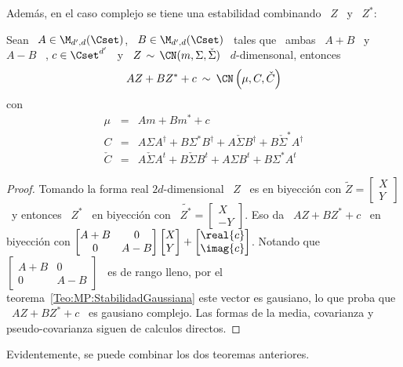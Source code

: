 Adem\'as, en el  caso complejo se tiene  una estabilidad combinando \ $Z$  \ y \
$Z^*$:
%
\begin{teorema}%
\label{Teo:MP:StabilidadGaussianaComplejaZZestrella}
%
Sean \ $A \in \M_{d',d}(\Cset)$, \  $B \in \M_{d',d}(\Cset)$ \ tales que \ ambas
\ $A+B$ \ y \  $A-B$ \ \SZ{sean de rango lleno}, $c \in \Cset^{d'}$  \ y \ $Z \,
\sim \, \CN(m,\Sigma,\check{\Sigma})$ \ $d$-dimensonal, entonces
  \[
  A Z + B Z^* + c \: \sim \: \CN\left( \mu , C , \check{C}  \right)
  \]
  con
  \[
  \begin{array}{lll}
  \mu & = & A m + B m^* + c\\[2.5mm]
  C & = & A \Sigma A^\dag + B \Sigma^* B^\dag + A \check{\Sigma} B^\dag + B
  \check{\Sigma}^* A^\dag\\[2.5mm]
  \check{C} & = & A \check{\Sigma} A^t + B \check{\Sigma} B^t + A \Sigma B^t + B
  \Sigma^* A^t
  \end{array}
  \]
\end{teorema}
\begin{proof}
  Tomando  la  forma  real  $2d$-dimensional  \  $Z$ \  es  en  biyecci\'on  con
  $\widetilde{Z} = \begin{bmatrix} X\\ Y \end{bmatrix}$ \ y entonces \ $Z^*$ \ en
  biyecci\'on con \ $\widetilde{Z^*} = \begin{bmatrix} X\\-Y \end{bmatrix}$. Eso
  da \ $A  Z + B Z^*  + c$ \ en biyecci\'on  con $\begin{bmatrix} A+B &  0\\ 0 &
    A-B  \end{bmatrix}  \begin{bmatrix}  X\\ Y  \end{bmatrix}  +  \begin{bmatrix}
    \real{c}\\ \imag{c} \end{bmatrix}$. Notando que \ $\begin{bmatrix} A+B & 0\\
    0    &   A-B    \end{bmatrix}$   \    es    de   rango    lleno,   por    el
  teorema~\ref{Teo:MP:StabilidadGaussiana} este vector es gausiano, lo que proba
  que \  $A Z  + B  Z^* + c$  \ es  gausiano complejo. Las  formas de  la media,
  covarianza y pseudo-covarianza siguen de calculos directos.
\end{proof}
%
Evidentemente, se puede combinar los dos teoremas anteriores.

